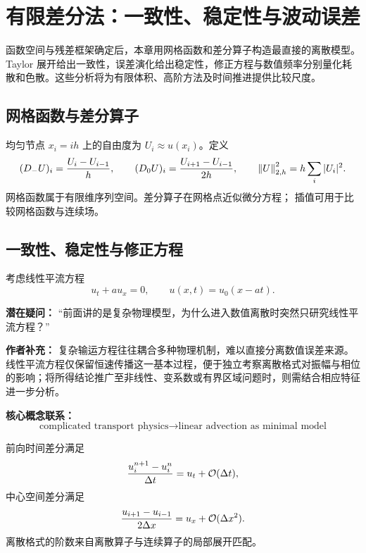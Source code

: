 \chapter{有限差分法：一致性、稳定性与波动误差}\label{ch:7}
\begin{chaptersummary}
函数空间与残差框架确定后，本章用网格函数和差分算子构造最直接的离散模型。Taylor 展开给出一致性，误差演化给出稳定性，修正方程与数值频率分别量化耗散和色散。这些分析将为有限体积、高阶方法及时间推进提供比较尺度。
\end{chaptersummary}
\section{网格函数与差分算子}
均匀节点 $x_i=ih$ 上的自由度为 $U_i\approx u(x_i)$。定义
\[
(D_-U)_i=\frac{U_i-U_{i-1}}h,\qquad
(D_0U)_i=\frac{U_{i+1}-U_{i-1}}{2h},\qquad
\left\lVert U\right\rVert_{2,h}^2=h\sum_i|U_i|^2.
\]
网格函数属于有限维序列空间。差分算子在网格点近似微分方程；
插值可用于比较网格函数与连续场。
\section{一致性、稳定性与修正方程}
考虑线性平流方程
\[
u_t+au_x=0,
\qquad
u(x,t)=u_0(x-at).
\]

\begin{authornote}
\textbf{潜在疑问：}
“前面讲的是复杂物理模型，为什么进入数值离散时突然只研究线性平流方程？”

\textbf{作者补充：}
复杂输运方程往往耦合多种物理机制，难以直接分离数值误差来源。线性平流方程仅保留恒速传播这一基本过程，便于独立考察离散格式对振幅与相位的影响；将所得结论推广至非线性、变系数或有界区域问题时，则需结合相应特征进一步分析。

\textbf{核心概念联系：}
\[
\text{complicated transport physics}
\longrightarrow
\text{linear advection as minimal model}
\]
\end{authornote}

前向时间差分满足
\[
\frac{u_i^{n+1}-u_i^n}{\Delta t}
=
u_t+\mathcal O(\Delta t),
\]
中心空间差分满足
\[
\frac{u_{i+1}-u_{i-1}}{2\Delta x}
=
u_x+\mathcal O(\Delta x^2).
\]
离散格式的阶数来自离散算子与连续算子的局部展开匹配。

